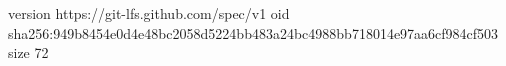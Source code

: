 version https://git-lfs.github.com/spec/v1
oid sha256:949b8454e0d4e48bc2058d5224bb483a24bc4988bb718014e97aa6cf984cf503
size 72
